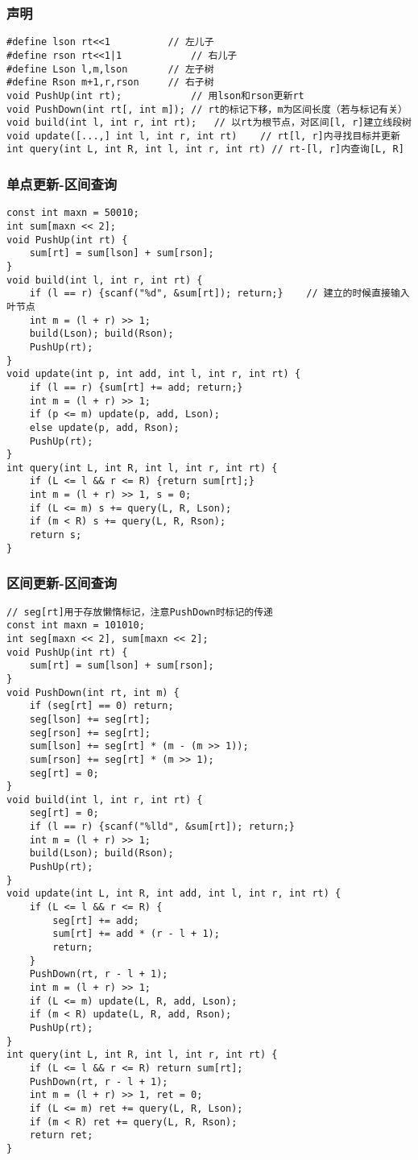 \documentclass[a4]{article}
\begin{document}
\subsubsection{声明}
\begin{lstlisting}
#define lson rt<<1			// 左儿子
#define rson rt<<1|1			// 右儿子
#define Lson l,m,lson		// 左子树
#define Rson m+1,r,rson 	// 右子树
void PushUp(int rt);			// 用lson和rson更新rt
void PushDown(int rt[, int m]);	// rt的标记下移，m为区间长度（若与标记有关）
void build(int l, int r, int rt);	// 以rt为根节点，对区间[l, r]建立线段树
void update([...,] int l, int r, int rt)	// rt[l, r]内寻找目标并更新
int query(int L, int R, int l, int r, int rt) // rt-[l, r]内查询[L, R] 
\end{lstlisting}
\subsubsection{单点更新-区间查询}
\begin{lstlisting}
const int maxn = 50010;
int sum[maxn << 2];
void PushUp(int rt) {
	sum[rt] = sum[lson] + sum[rson];
}
void build(int l, int r, int rt) {
	if (l == r) {scanf("%d", &sum[rt]); return;}	// 建立的时候直接输入叶节点
	int m = (l + r) >> 1;
	build(Lson); build(Rson);
	PushUp(rt);
}
void update(int p, int add, int l, int r, int rt) {
	if (l == r) {sum[rt] += add; return;}
	int m = (l + r) >> 1;
	if (p <= m) update(p, add, Lson);
	else update(p, add, Rson);
	PushUp(rt);
}
int query(int L, int R, int l, int r, int rt) {
	if (L <= l && r <= R) {return sum[rt];}
	int m = (l + r) >> 1, s = 0;
	if (L <= m) s += query(L, R, Lson);
	if (m < R) s += query(L, R, Rson);
	return s;
}
\end{lstlisting}
\subsubsection{区间更新-区间查询}
\begin{lstlisting}
// seg[rt]用于存放懒惰标记，注意PushDown时标记的传递
const int maxn = 101010;
int seg[maxn << 2], sum[maxn << 2];
void PushUp(int rt) {
	sum[rt] = sum[lson] + sum[rson];
}
void PushDown(int rt, int m) {
	if (seg[rt] == 0) return;
	seg[lson] += seg[rt];
	seg[rson] += seg[rt];
	sum[lson] += seg[rt] * (m - (m >> 1));
	sum[rson] += seg[rt] * (m >> 1);
	seg[rt] = 0;
}
void build(int l, int r, int rt) {
	seg[rt] = 0;
	if (l == r) {scanf("%lld", &sum[rt]); return;}
	int m = (l + r) >> 1;
	build(Lson); build(Rson);
	PushUp(rt);
}
void update(int L, int R, int add, int l, int r, int rt) {
	if (L <= l && r <= R) {
		seg[rt] += add;
		sum[rt] += add * (r - l + 1);
		return;
	}
	PushDown(rt, r - l + 1);
	int m = (l + r) >> 1;
	if (L <= m) update(L, R, add, Lson);
	if (m < R) update(L, R, add, Rson);
	PushUp(rt);
}
int query(int L, int R, int l, int r, int rt) {
	if (L <= l && r <= R) return sum[rt];
	PushDown(rt, r - l + 1);
	int m = (l + r) >> 1, ret = 0;
	if (L <= m) ret += query(L, R, Lson);
	if (m < R) ret += query(L, R, Rson);
	return ret;
}
\end{lstlisting}
\clearpage
\end{document}
